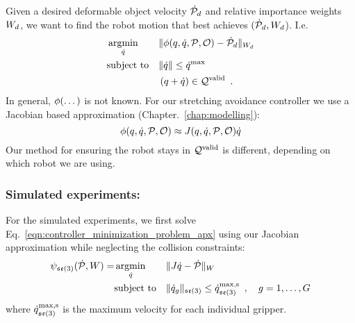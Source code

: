 Given a desired deformable object velocity $\dot{\mathcal{P}}_d$ and relative importance weights $W_d$, we want to find the robot motion that best achieves $(\dot{\mathcal{P}}_d, W_d$). I.e.
\begin{equation}
\begin{aligned}
    & \operatorname*{argmin}_{\dot{q}} 
        & & \| \phi(q, \dot{q}, \mathcal{P}, \mathcal{O}) - \dot{\mathcal{P}}_d \|_{W_d} \\
    & \text{subject to}
        & & \| \dot{q} \| \leq \dot{q}^\textrm{max} \\
    &   & & \left(q + \dot{q} \right) \in \mathcal{Q}^{\textrm{valid}} \enspace .
\end{aligned}
\label{eqn:controller_minimization_problem_apx}
\end{equation}
In general, $\phi(\dots)$ is not known. For our stretching avoidance controller we use a Jacobian based approximation (Chapter.~\ref{chap:modelling}):
\begin{equation}
    \phi(q, \dot{q}, \mathcal{P}, \mathcal{O}) \approx J(q, \dot{q}, \mathcal{P}, \mathcal{O}) \dot{q}
\end{equation}
Our method for ensuring the robot stays in $\mathcal{Q}^{\textrm{valid}}$ is different, depending on which robot we are using.

\subsubsection{Simulated experiments:}

For the simulated experiments, we first solve Eq.~\eqref{eqn:controller_minimization_problem_apx} using our Jacobian approximation while neglecting the collision constraints:
\begin{equation}
\begin{aligned}
    \psi_{\mathfrak{se}(3)}(\dot{\mathcal{P}}, W) =
        &\operatorname*{argmin}_{\dot{q} }
            & & \| J \dot{q} - \dot{\mathcal{P}} \|_{W} \\
        &\textrm{subject to}
            & & \| \dot{q}_g \|_{\mathfrak{se}(3)} \leq \dot{q}^\textrm{max,s}_{\mathfrak{se}(3)} \enspace, \quad g = 1, \dots, G
    \label{eqn:jacobianbackwardfunction_sim}
\end{aligned}
\end{equation}
where $\dot{q}^\textrm{max,s}_{\mathfrak{se}(3)}$ is the maximum velocity for each individual gripper.

